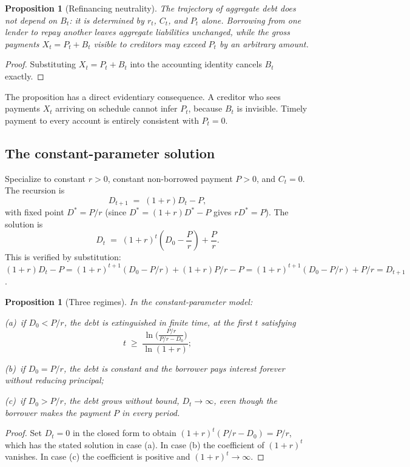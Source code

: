 \documentclass[11pt]{article}
\newtheorem{proposition}[theorem]{Proposition}
\theoremstyle{definition}
\theoremstyle{remark}
\begin{document}
\begin{proposition}[Refinancing neutrality]\label{prop:neutral}
The trajectory of aggregate debt does not depend on $B_t$: it is determined by $r_t$, $C_t$, and $P_t$ alone. Borrowing from one lender to repay another leaves aggregate liabilities unchanged, while the gross payments $X_t=P_t+B_t$ visible to creditors may exceed $P_t$ by an arbitrary amount.
\end{proposition}

\begin{proof}
Substituting $X_t=P_t+B_t$ into the accounting identity cancels $B_t$ exactly.
\end{proof}

The proposition has a direct evidentiary consequence. A creditor who sees payments $X_t$ arriving on schedule cannot infer $P_t$, because $B_t$ is invisible. Timely payment to every account is entirely consistent with $P_t=0$.

\subsection{The constant-parameter solution}

Specialize to constant $r>0$, constant non-borrowed payment $P>0$, and $C_t=0$. The recursion is
\[
D_{t+1} \;=\; (1+r)D_t - P,
\]
with fixed point $D^\ast=P/r$ (since $D^\ast=(1+r)D^\ast-P$ gives $rD^\ast=P$). The solution is
\[
D_t \;=\; (1+r)^t\left(D_0-\frac{P}{r}\right)+\frac{P}{r}.
\]
This is verified by substitution: $(1+r)D_t-P=(1+r)^{t+1}(D_0-P/r)+(1+r)P/r-P=(1+r)^{t+1}(D_0-P/r)+P/r=D_{t+1}$.

\begin{proposition}[Three regimes]\label{prop:regimes}
In the constant-parameter model:
\par\smallskip\noindent(a)~if $D_0<P/r$, the debt is extinguished in finite time, at the first $t$ satisfying
\[ t\;\ge\;\frac{\ln\big(\tfrac{P/r}{P/r-D_0}\big)}{\ln(1+r)};\]
\par\smallskip\noindent(b)~if $D_0=P/r$, the debt is constant and the borrower pays interest forever without reducing principal;
\par\smallskip\noindent(c)~if $D_0>P/r$, the debt grows without bound, $D_t\to\infty$, even though the borrower makes the payment $P$ in every period.
\end{proposition}

\begin{proof}
Set $D_t=0$ in the closed form to obtain $(1+r)^t(P/r-D_0)=P/r$, which has the stated solution in case (a). In case (b) the coefficient of $(1+r)^t$ vanishes. In case (c) the coefficient is positive and $(1+r)^t\to\infty$.
\end{proof}
\end{document}
